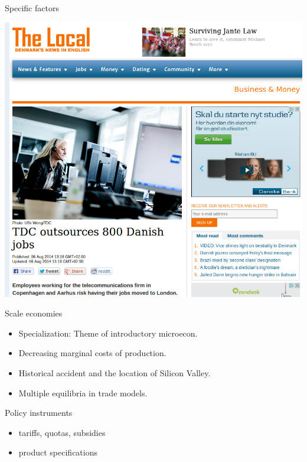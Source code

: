 \documentclass[ignorenonframetext,]{beamer}
\begin{document}
\begin{frame}{Specific factors}

    \includegraphics[scale=0.3]{jobs_to_london.png}

\end{frame}

\begin{frame}{Scale economies}

    \begin{itemize}
        \item Specialization: Theme of introductory microecon.
        \item Decreasing marginal costs of production.
        \item Historical accident and the location of Silicon Valley.
        \item Multiple equilibria in trade models.
    \end{itemize}

\end{frame}

\begin{frame}{Policy instruments}

    \begin{itemize}
        \item tariffs, quotas, subsidies
        \item product specifications
    \end{itemize}

\end{frame}
\end{document}

